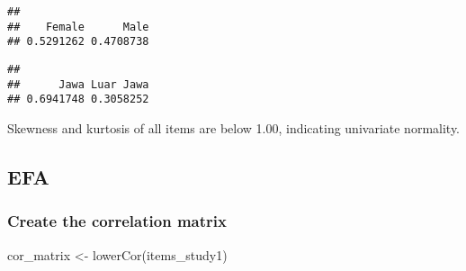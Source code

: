 \documentclass[
]{article}
\newenvironment{Shaded}{\begin{snugshade}}{\end{snugshade}}
\newcommand{\FunctionTok}[1]{\textcolor[rgb]{0.00,0.00,0.00}{#1}}
\newcommand{\NormalTok}[1]{#1}
\newcommand{\OtherTok}[1]{\textcolor[rgb]{0.56,0.35,0.01}{#1}}
\newcommand{\SpecialCharTok}[1]{\textcolor[rgb]{0.00,0.00,0.00}{#1}}
\begin{document}
\begin{Shaded}
\end{Shaded}

\begin{verbatim}
## 
##    Female      Male 
## 0.5291262 0.4708738
\end{verbatim}

\begin{Shaded}
\end{Shaded}

\begin{verbatim}
## 
##      Jawa Luar Jawa 
## 0.6941748 0.3058252
\end{verbatim}

Skewness and kurtosis of all items are below 1.00, indicating univariate
normality.

\hypertarget{efa}{%
\subsection{EFA}\label{efa}}

\hypertarget{create-the-correlation-matrix}{%
\subsubsection{Create the correlation
matrix}\label{create-the-correlation-matrix}}

\begin{Shaded}
\begin{Highlighting}[]
\NormalTok{cor\_matrix }\OtherTok{\textless{}{-}} \FunctionTok{lowerCor}\NormalTok{(items\_study1)}
\end{Highlighting}
\end{Shaded}
\end{document}
